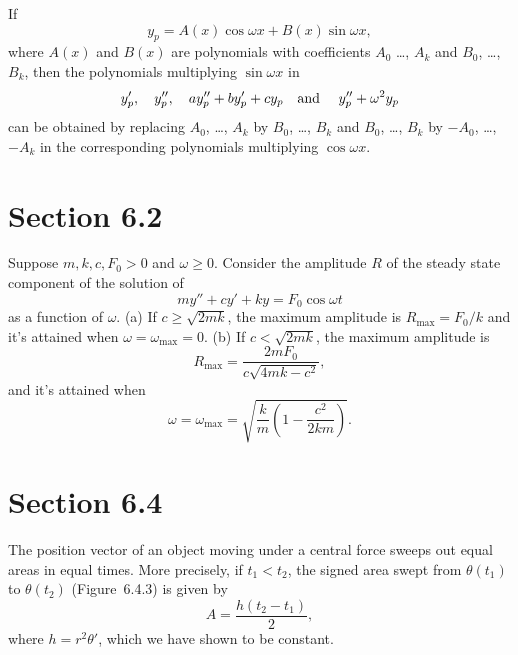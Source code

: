 \setcounter{theorem}{1}
\begin{theorem}
  \label{thmtype:5.5.2} If
  \[
    y_{p}=A(x)\cos\omega x+B(x)\sin\omega x,
  \]
  where $A(x)$ and $B(x)$ are polynomials with coefficients $A_{0}$ \dots, $A_{k}$ and $B_{0}$,
  \dots, $B_{k}$, then the polynomials multiplying $\sin\omega x$ in
  \[
    y_{p}',\quad y_{p}'',\quad ay_{p}''+by_{p}'+cy_{p}\mbox{\quad and \quad}y_{p}''+\omega^{2}y_{p}
  \]
  can be obtained by replacing $A_{0}$, \dots, $A_{k}$ by $B_{0}$, \dots, $B_{k}$ and $B_{0}$,
  \dots, $B_{k}$ by $-A_{0}$, \dots, $-A_{k}$ in the corresponding polynomials multiplying
  $\cos\omega x$.
\end{theorem}

\section*{Section 6.2}
{}
\setcounter{chapter}{6}
\setcounter{section}{2}

\setcounter{theorem}{0}
\setcounter{equation}{19}
\begin{theorem}
  \label{thmtype:6.2.1} Suppose $m,k,c,F_{0}>0$ and $\omega\ge0$. Consider the amplitude $R$ of the steady state component of the
  solution of
  \[
    my''+cy'+ky=F_{0}\cos\omega t
  \]
  as a function of $\omega$.
  \newline
  \indent
  {\rm(a)} If $c\ge\sqrt{2mk}$, the maximum amplitude is $R_{\max}=F_{0}/k$ and it's attained when
  $\omega= \omega_{\max}=0$.
  \newline
  \indent
  {\rm(b)} If $c<\sqrt{2mk}$, the maximum amplitude is
  \begin{equation}
    \label{eq:6.2.20}R_{\max}=\frac{2mF_{0}}{c\sqrt{4mk-c^{2}}},
  \end{equation}
  and it's attained when
  \begin{equation}
    \label{eq:6.2.21}\omega=\omega_{\max}=\sqrt{\frac{k}{m}\left(1-\frac{c^{2}}{2km}\right)}.
  \end{equation}
\end{theorem}

\section*{Section 6.4}
\setcounter{chapter}{6}
\setcounter{section}{4}

\setcounter{theorem}{0}
\begin{theorem}
  \label{thmtype:6.4.1} The position vector of an object moving under a central force sweeps out
  equal areas in equal times. More precisely, if $t_{1}<t_{2}$, the signed area swept from
  $\theta(t_{1})$ to $\theta(t_{2})$ {\rm (Figure~6.4.3)} is given by
  \[
    A=\frac{h(t_{2}-t_{1})}{2},
  \]
  where $h=r^{2}\theta'$, which we have shown to be constant.
\end{theorem}

